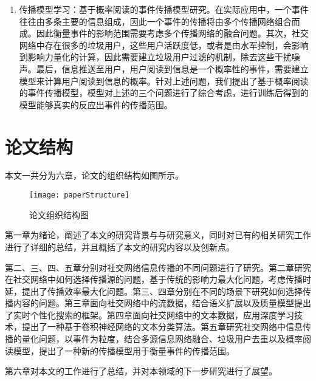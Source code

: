 \begin{enumerate}
	\item 传播模型学习：基于概率阅读的事件传播模型研究。在实际应用中，一个事件往往由多条主要的信息组成，因此一个事件的传播将由多个传播网络组合而成。因此衡量事件的影响范围需要考虑多个传播网络的融合问题。其次，社交网络中存在很多的垃圾用户，这些用户活跃度低，或者是由水军控制，会影响到影响力量化的计算，因此需要建立垃圾用户过滤的机制，除去这些干扰噪声。最后，信息推送至用户，用户阅读到信息是一个概率性的事件，需要建立模型来计算用户阅读到信息的概率。针对上述问题，我们提出了基于概率阅读的事件传播模型，模型对上述的三个问题进行了综合考虑，进行训练后得到的模型能够真实的反应出事件的传播范围。
\end{enumerate}
\section{论文结构}
\label{sec1:paperStructure}
本文一共分为六章，论文的组织结构如图所示。
\begin{figure}[!ht]
    \centering
    \texttt{[image: paperStructure]}
    \caption{论文组织结构图}
    \label{fig:paperStructure}
\end{figure}

第一章为绪论，阐述了本文的研究背景与与研究意义，同时对已有的相关研究工作进行了详细的总结，并且概括了本文的研究内容以及创新点。

第二、三、四、五章分别对社交网络信息传播的不同问题进行了研究。第二章研究在社交网络中如何选择传播源的问题，基于传统的影响力最大化问题，考虑传播时延，提出了传播效率最大化问题。第三、四章分别在不同的场景下研究如何选择传播内容的问题。第三章面向社交网络中的流数据，结合语义扩展以及质量模型提出了实时个性化搜索的框架。第四章面向社交网络中的文本数据，应用深度学习技术，提出了一种基于卷积神经网络的文本分类算法。第五章研究社交网络中信息传播的量化问题，以事件为粒度，结合多源信息网络融合、垃圾用户去重以及概率阅读模型，提出了一种新的传播模型用于衡量事件的传播范围。

第六章对本文的工作进行了总结，并对本领域的下一步研究进行了展望。
